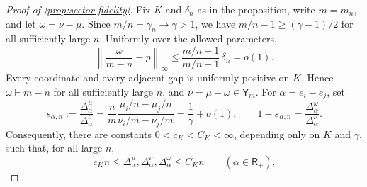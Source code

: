 \documentclass[11pt]{article}
\theoremstyle{remark}
\theoremstyle{plain}
\begin{document}
\begin{proof}[Proof of \cref{prop:sector-fidelity}]
Fix \(K\) and \(\delta_n\) as in the proposition, write \(m=m_n\), and let
\(\omega=\nu-\mu\).  Since \(m/n=\gamma_n\to\gamma>1\), we have
\(m/n-1\ge(\gamma-1)/2\) for all sufficiently large \(n\).
Uniformly over the allowed parameters,
\[
  \left\|\frac\omega{m-n}-p\right\|_\infty
  \le\frac{m/n+1}{m/n-1}\,\delta_n=o(1).
\]
Every coordinate and every adjacent gap is uniformly positive on \(K\).
Hence \(\omega\vdash m-n\) for all sufficiently large \(n\), and
\(\nu=\mu+\omega\in\mathsf Y_m\).  For
\(\alpha=e_i-e_j\), set
\begin{equation}\label{eq:splitting-fraction}
  s_{\alpha,n}
  :=\frac{\Delta_\alpha^\mu}{\Delta_\alpha^\nu}
    =\frac{n}{m}
      \frac{\mu_i/n-\mu_j/n}{\nu_i/m-\nu_j/m}
    =\frac1\gamma+o(1),
  \qquad
  1-s_{\alpha,n}=\frac{\Delta_\alpha^\omega}{\Delta_\alpha^\nu}.
\end{equation}
Consequently, there are constants
\(0<c_K<C_K<\infty\), depending only on \(K\) and
\(\gamma\), such that, for all large \(n\),
\begin{equation}\label{eq:uniform-sector-gaps}
  c_Kn
  \le\Delta_\alpha^\mu,\Delta_\alpha^\nu,\Delta_\alpha^\omega
  \le C_Kn
  \qquad(\alpha\in\mathsf R_+).
\end{equation}


\end{proof}
\end{document}
